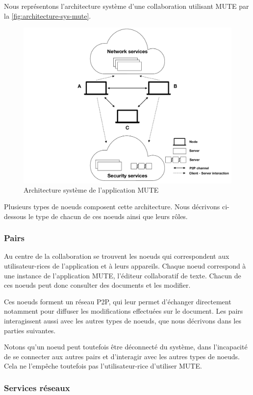 Nous représentons l'architecture système d'une collaboration utilisant MUTE par la \autoref{fig:architecture-sys-mute}.

\begin{figure}[!ht]
  \centering
  \includegraphics[page=1, trim=0cm 0cm 0cm 0cm, clip, width=.7\linewidth]{img/mute-figures.pdf}
  \caption{Architecture système de l'application MUTE}
  \label{fig:architecture-sys-mute}
\end{figure}

Plusieurs types de noeuds composent cette architecture.
Nous décrivons ci-dessous le type de chacun de ces noeuds ainsi que leurs rôles.

\subsubsection{Pairs}

Au centre de la collaboration se trouvent les noeuds qui correspondent aux utilisateur-rices de l'application et à leurs appareils.
Chaque noeud correspond à une instance de l'application \ac{MUTE}, \ie l'éditeur collaboratif de texte.
Chacun de ces noeuds peut donc consulter des documents et les modifier.

Ces noeuds forment un réseau \ac{P2P}, qui leur permet d'échanger directement notamment pour diffuser les modifications effectuées sur le document.
Les pairs interagissent aussi avec les autres types de noeuds, que nous décrivons dans les parties suivantes.

Notons qu'un noeud peut toutefois être déconnecté du système, \ie dans l'incapacité de se connecter aux autres pairs et d'interagir avec les autres types de noeuds.
Cela ne l'empêche toutefois pas l'utilisateur-rice d'utiliser \ac{MUTE}.

\subsubsection{Services réseaux}


